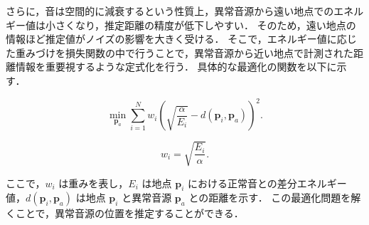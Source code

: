 \documentclass[../main]{subfiles}
\begin{document}
さらに，音は空間的に減衰するという性質上，異常音源から遠い地点でのエネルギー値は小さくなり，推定距離の精度が低下しやすい．
そのため，遠い地点の情報ほど推定値がノイズの影響を大きく受ける．
そこで，エネルギー値に応じた重みづけを損失関数の中で行うことで，異常音源から近い地点で計測された距離情報を重要視するような定式化を行う．
具体的な最適化の関数を以下に示す．

\begin{equation}
    \min_{\mathbf{p}_a} \sum_{i=1}^{N} w_i \left( \sqrt{\frac{\alpha}{E_i}} - d(\mathbf{p}_i, \mathbf{p}_a) \right)^2.
\end{equation}

\begin{equation}
    {w_i} = \sqrt{\frac{E_i}{\alpha}}.
\end{equation}

ここで，$w_i$ は重みを表し，$E_i$ は地点 $\mathbf{p}_i$ における正常音との差分エネルギー値，$d(\mathbf{p}_i, \mathbf{p}_a)$ は地点 $\mathbf{p}_i$ と異常音源 $\mathbf{p}_a$ との距離を示す．
この最適化問題を解くことで，異常音源の位置を推定することができる．
\end{document}
